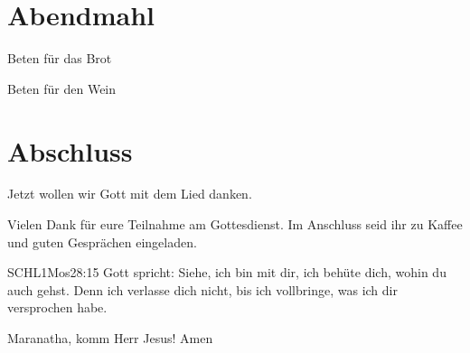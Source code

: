 \documentclass{mybib}
\begin{document}


\section{Abendmahl}

Beten für das Brot


Beten für den Wein


\section{Abschluss}

Jetzt wollen wir Gott mit dem Lied  danken.

Vielen Dank für eure Teilnahme am Gottesdienst. Im Anschluss seid ihr zu Kaffee und guten Gesprächen eingeladen.
\beten{}

\begin{bibelbox}{SCHL}{1Mos}{28:15}
Gott spricht: Siehe, ich bin mit dir,
ich behüte dich, wohin du auch gehst.
Denn ich verlasse dich nicht,
bis ich vollbringe, was ich dir versprochen habe.
\end{bibelbox}

Maranatha, komm Herr Jesus! Amen
\end{document}
